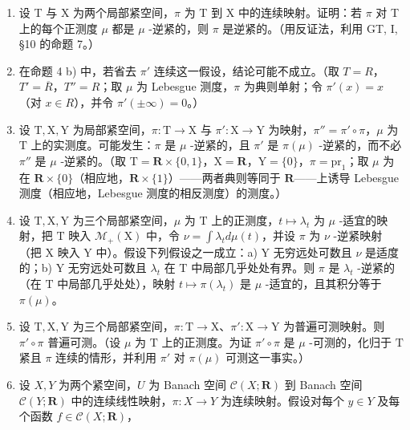 \begin{enumerate}
\def\labelenumi{\arabic{enumi})}
\setcounter{enumi}{16}
\item
  设 T 与 X 为两个局部紧空间，\(\pi\) 为 T 到 X 中的连续映射。证明：若 \(\pi\) 对 T 上的每个正测度 \(\mu\) 都是 \(\mu\) -逆紧的，则 \(\pi\) 是逆紧的。（用反证法，利用 GT, I, §10 的命题 7。）
\item
  在命题 4 b) 中，若省去 \(\pi'\) 连续这一假设，结论可能不成立。（取 \(T = R\)，\(T' = \overline{R}\)，\(T'' = R\)；取 \(\mu\) 为 Lebesgue 测度，\(\pi\) 为典则单射；令 \(\pi'(x) = x\)（对 \(x \in R\)），并令 \(\pi'(\pm \infty) = 0\)。）
\item
  设 \(\mathrm{T}, \mathrm{X}, \mathrm{Y}\) 为局部紧空间，\(\pi : \mathrm{T} \to \mathrm{X}\) 与 \(\pi' : \mathrm{X} \to \mathrm{Y}\) 为映射，\(\pi'' = \pi' \circ \pi\)，\(\mu\) 为 \(\mathrm{T}\) 上的实测度。可能发生：\(\pi\) 是 \(\mu\) -逆紧的，且 \(\pi'\) 是 \(\pi(\mu)\) -逆紧的，而不必 \(\pi''\) 是 \(\mu\) -逆紧的。（取 \(\mathrm{T} = \mathbf{R} \times \{0, 1\}\)，\(\mathrm{X} = \mathbf{R}\)，\(\mathrm{Y} = \{0\}\)，\(\pi = \mathrm{pr}_1\)；取 \(\mu\) 为在 \(\mathbf{R} \times \{0\}\)（相应地，\(\mathbf{R} \times \{1\}\)）——两者典则等同于 \(\mathbf{R}\)——上诱导 Lebesgue 测度（相应地，Lebesgue 测度的相反测度）的测度。）
\item
  设 \(\mathrm{T},\mathrm{X},\mathrm{Y}\) 为三个局部紧空间，\(\mu\) 为 \(\mathrm{T}\) 上的正测度，\(t\mapsto \lambda_t\) 为 \(\mu\) -适宜的映射，把 \(\mathrm{T}\) 映入 \(\mathcal{M}_{+}(\mathrm{X})\) 中，令 \(\nu = \int \lambda_t d\mu (t)\)，并设 \(\pi\) 为 \(\nu\) -逆紧映射（把 \(\mathrm{X}\) 映入 \(\mathrm{Y}\) 中）。假设下列假设之一成立：a) \(\mathrm{Y}\) 无穷远处可数且 \(\nu\) 是适度的；b) \(\mathrm{Y}\) 无穷远处可数且 \(\lambda_t\) 在 \(\mathrm{T}\) 中局部几乎处处有界。则 \(\pi\) 是 \(\lambda_t\) -逆紧的（在 \(\mathrm{T}\) 中局部几乎处处），映射 \(t\mapsto \pi (\lambda_t)\) 是 \(\mu\) -适宜的，且其积分等于 \(\pi (\mu)\)。
\item
  设 \(\mathrm{T},\mathrm{X},\mathrm{Y}\) 为三个局部紧空间，\(\pi : \mathrm{T} \to \mathrm{X}\)、\(\pi': \mathrm{X} \to \mathrm{Y}\) 为普遍可测映射。则 \(\pi' \circ \pi\) 普遍可测。（设 \(\mu\) 为 \(\mathrm{T}\) 上的正测度。为证 \(\pi' \circ \pi\) 是 \(\mu\) -可测的，化归于 \(\mathrm{T}\) 紧且 \(\pi\) 连续的情形，并利用 \(\pi'\) 对 \(\pi(\mu)\) 可测这一事实。）
\item
  设 \(X, Y\) 为两个紧空间，\(U\) 为 Banach 空间 \(\mathcal{C}(X; \mathbf{R})\) 到 Banach 空间 \(\mathcal{C}(Y; \mathbf{R})\) 中的连续线性映射，\(\pi : X \to Y\) 为连续映射。假设对每个 \(y \in Y\) 及每个函数 \(f \in \mathcal{C}(X; \mathbf{R})\)，
\end{enumerate}

